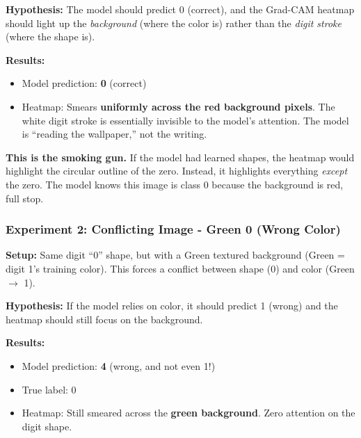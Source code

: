 \documentclass[9pt,a4paper,twocolumn,twoside]{tau-class/tau}
\begin{document}
        \textbf{Hypothesis:} The model should predict 0 (correct), and the Grad-CAM heatmap should light up the \textit{background} (where the color is) rather than the \textit{digit stroke} (where the shape is).

        \textbf{Results:}
        \begin{itemize}
            \item Model prediction: \textbf{0} (correct)
            \item Heatmap: Smears \textbf{uniformly across the red background pixels}. The white digit stroke is essentially invisible to the model's attention. The model is ``reading the wallpaper,'' not the writing.
        \end{itemize}

        \begin{note}
            \textbf{This is the smoking gun.} If the model had learned shapes, the heatmap would highlight the circular outline of the zero. Instead, it highlights everything \textit{except} the zero. The model knows this image is class 0 because the background is red, full stop.
        \end{note}

        \subsubsection{Experiment 2: Conflicting Image - Green 0 (Wrong Color)}

        \textbf{Setup:} Same digit ``0'' shape, but with a Green textured background (Green = digit 1's training color). This forces a conflict between shape (0) and color (Green $\rightarrow$ 1).

        \textbf{Hypothesis:} If the model relies on color, it should predict 1 (wrong) and the heatmap should still focus on the background.

        \textbf{Results:}
        \begin{itemize}
            \item Model prediction: \textbf{4} (wrong, and not even 1!)
            \item True label: 0
            \item Heatmap: Still smeared across the \textbf{green background}. Zero attention on the digit shape.
        \end{itemize}
\end{document}
